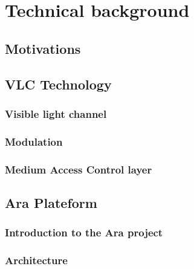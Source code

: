 \chapter{Technical background}

\label{Technical}



\section{Motivations}



\section{VLC Technology}

\subsection{Visible light channel}
\subsection{Modulation}
\subsection{Medium Access Control layer}

\section{Ara Plateform}
\subsection{Introduction to the Ara project}
\subsection{Architecture}
